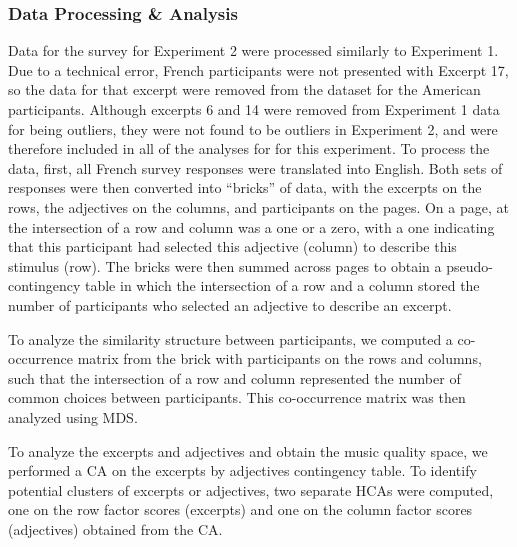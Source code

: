 \documentclass[
  english,
  man,floatsintext]{apa6}
\begin{document}
\hypertarget{data-processing-analysis}{%
\subsubsection{Data Processing \& Analysis}\label{data-processing-analysis}}

Data for the survey for Experiment 2 were processed similarly to Experiment 1. Due to a technical error, French participants were not presented with Excerpt 17, so the data for that excerpt were removed from the dataset for the American participants. Although excerpts 6 and 14 were removed from Experiment 1 data for being outliers, they were not found to be outliers in Experiment 2, and were therefore included in all of the analyses for for this experiment. To process the data, first, all French survey responses were translated into English. Both sets of responses were then converted into ``bricks'' of data, with the excerpts on the rows, the adjectives on the columns, and participants on the pages. On a page, at the intersection of a row and column was a one or a zero, with a one indicating that this participant had selected this adjective (column) to describe this stimulus (row). The bricks were then summed across pages to obtain a pseudo-contingency table in which the intersection of a row and a column stored the number of participants who selected an adjective to describe an excerpt.

To analyze the similarity structure between participants, we computed a co-occurrence matrix from the brick with participants on the rows and columns, such that the intersection of a row and column represented the number of common choices between participants. This co-occurrence matrix was then analyzed using MDS.

To analyze the excerpts and adjectives and obtain the music quality space, we performed a CA on the excerpts by adjectives contingency table. To identify potential clusters of excerpts or adjectives, two separate HCAs were computed, one on the row factor scores (excerpts) and one on the column factor scores (adjectives) obtained from the CA.
\end{document}
